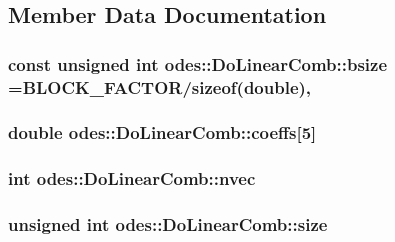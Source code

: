 \subsection{Member Data Documentation}
\hypertarget{classodes_1_1DoLinearComb_aa174ae87b125c39ac5afb2355efca9f2}{
\subsubsection[{bsize}]{\setlength{\rightskip}{0pt plus 5cm}const unsigned int odes\-::\-Do\-Linear\-Comb\-::bsize ={\bf B\-L\-O\-C\-K\-\_\-\-F\-A\-C\-T\-O\-R}/sizeof(double)\hspace{0.3cm}{\ttfamily [static]}, {\ttfamily [private]}}}\label{classodes_1_1DoLinearComb_aa174ae87b125c39ac5afb2355efca9f2}
\hypertarget{classodes_1_1DoLinearComb_a1cc69496a188c64186220467afda7152}{
\subsubsection[{coeffs}]{\setlength{\rightskip}{0pt plus 5cm}double odes\-::\-Do\-Linear\-Comb\-::coeffs\mbox{[}5\mbox{]}\hspace{0.3cm}{\ttfamily [private]}}}\label{classodes_1_1DoLinearComb_a1cc69496a188c64186220467afda7152}
\hypertarget{classodes_1_1DoLinearComb_a8d6bed1c8a4303372cde7d8ad5848d68}{
\subsubsection[{nvec}]{\setlength{\rightskip}{0pt plus 5cm}int odes\-::\-Do\-Linear\-Comb\-::nvec\hspace{0.3cm}{\ttfamily [private]}}}\label{classodes_1_1DoLinearComb_a8d6bed1c8a4303372cde7d8ad5848d68}
\hypertarget{classodes_1_1DoLinearComb_afe0cd5ac7e7ba7f5d38a1d686d20604d}{
\subsubsection[{size}]{\setlength{\rightskip}{0pt plus 5cm}unsigned int odes\-::\-Do\-Linear\-Comb\-::size\hspace{0.3cm}{\ttfamily [private]}}}\label{classodes_1_1DoLinearComb_afe0cd5ac7e7ba7f5d38a1d686d20604d}
